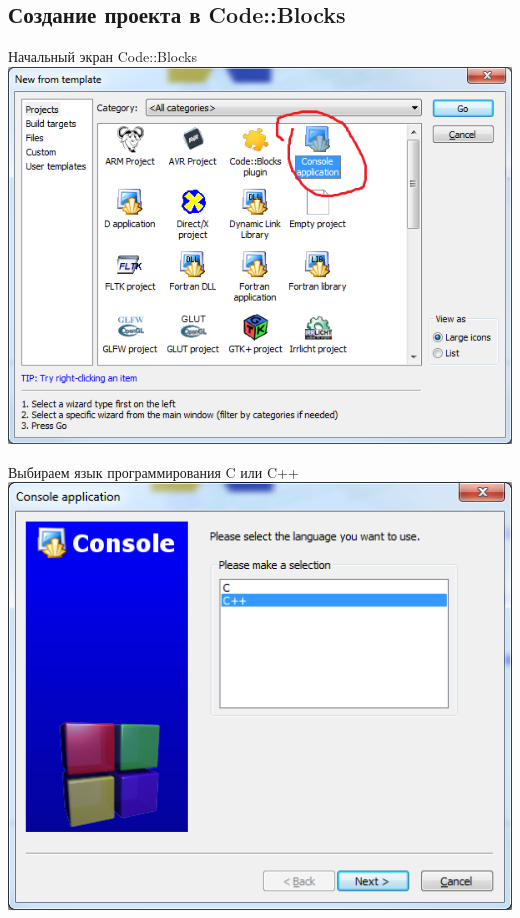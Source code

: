 \subsection{Создание проекта в Code::Blocks}

\begin{frame}[t]{Начальный экран Code::Blocks}
\includegraphics[width=\textwidth]{00_codeblocks/CodeBlocks_Console_application.png}
\end{frame}

\begin{frame}[t]{Выбираем язык программирования C или C++}
\includegraphics[width=\textwidth]{00_codeblocks/CodeBlocks_cpp.png}
\end{frame}

